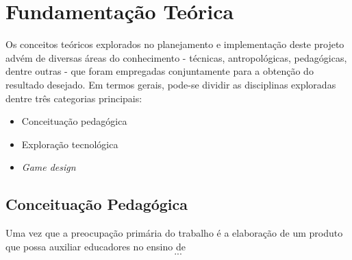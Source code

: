 
\chapter{Fundamentação Teórica}\label{cap-fundamentacao}

Os conceitos teóricos explorados no planejamento e implementação deste projeto advém de diversas áreas do conhecimento - técnicas, antropológicas, pedagógicas, dentre outras - que foram empregadas conjuntamente para a obtenção do resultado desejado. Em termos gerais, pode-se dividir as disciplinas exploradas dentre três categorias principais:

\begin{itemize}[label={--},noitemsep,topsep=0pt,leftmargin=4mm]
	\item Conceituação pedagógica
	\item Exploração tecnológica
	\item \textit{Game design}
\end{itemize}
 
\section{Conceituação Pedagógica}\label{sec-fund-conceituacao-pedagogica}

Uma vez que a preocupação primária do trabalho é a elaboração de um produto que possa auxiliar educadores no ensino de \[...\]

